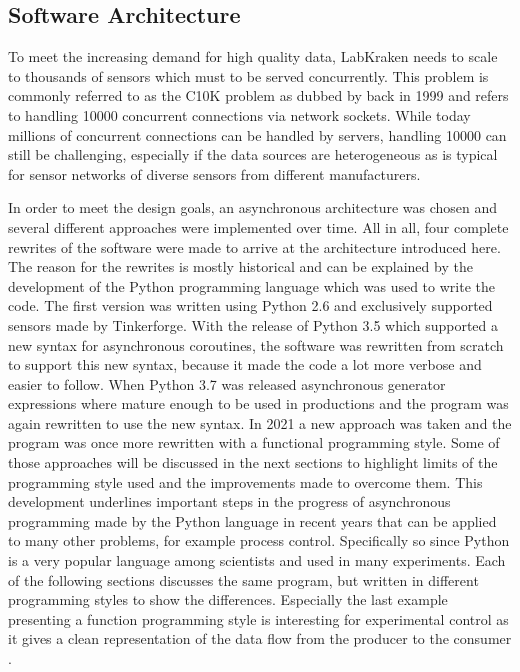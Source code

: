 \subsection{Software Architecture}
To meet the increasing demand for high quality data, LabKraken needs to scale to thousands of sensors which must to be served concurrently. This problem is commonly referred to as the C10K problem as dubbed by \citeauthor{10kProblem} back in 1999 \cite{10kProblem} and refers to handling \num{10000} concurrent connections via network sockets. While today millions of concurrent connections can be handled by servers, handling \num{10000} can still be challenging, especially if the data sources are heterogeneous as is typical for sensor networks of diverse sensors from different manufacturers.

In order to meet the design goals, an asynchronous architecture was chosen and several different approaches were implemented over time. All in all, four complete rewrites of the software were made to arrive at the architecture introduced here. The reason for the rewrites is mostly historical and can be explained by the development of the Python programming language which was used to write the code. The first version was written using Python 2.6 and exclusively supported sensors made by Tinkerforge. With the release of Python 3.5 which supported a new syntax for asynchronous coroutines, the software was rewritten from scratch to support this new syntax, because it made the code a lot more verbose and easier to follow. When Python 3.7 was released asynchronous generator expressions where mature enough to be used in productions and the program was again rewritten to use the new syntax. In 2021 a new approach was taken and the program was once more rewritten with a functional programming style. Some of those approaches will be discussed in the next sections to highlight limits of the programming style used and the improvements made to overcome them. This development underlines important steps in the progress of asynchronous programming made by the Python language in recent years that can be applied to many other problems, for example process control. Specifically so since Python is a very popular language among scientists and used in many experiments. Each of the following sections discusses the same program, but written in different programming styles to show the differences. Especially the last example presenting a function programming style is interesting for experimental control as it gives a clean representation of the data flow from the producer to the consumer \cite{concurrent_programming}.

